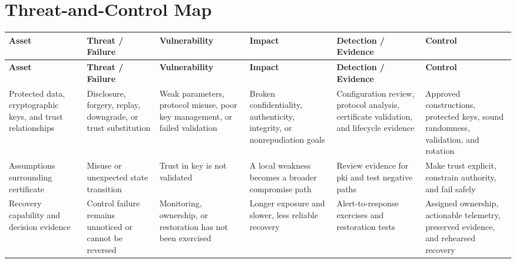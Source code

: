 \documentclass[11pt,letterpaper]{article}
\begin{document}
\section*{Threat-and-Control Map}
\begingroup\scriptsize\setlength{\tabcolsep}{2pt}
\begin{longtable}{>{\raggedright\arraybackslash}p{}>{\raggedright\arraybackslash}p{}>{\raggedright\arraybackslash}p{}>{\raggedright\arraybackslash}p{}>{\raggedright\arraybackslash}p{}>{\raggedright\arraybackslash}p{}}
\toprule\rowcolor{Navy}\color{white}\textbf{Asset} & \color{white}\textbf{Threat / Failure} & \color{white}\textbf{Vulnerability} & \color{white}\textbf{Impact} & \color{white}\textbf{Detection / Evidence} & \color{white}\textbf{Control}\\\midrule
\endfirsthead
\toprule\rowcolor{Navy}\color{white}\textbf{Asset} & \color{white}\textbf{Threat / Failure} & \color{white}\textbf{Vulnerability} & \color{white}\textbf{Impact} & \color{white}\textbf{Detection / Evidence} & \color{white}\textbf{Control}\\\midrule
\endhead
Protected data, cryptographic keys, and trust relationships & Disclosure, forgery, replay, downgrade, or trust substitution & Weak parameters, protocol misuse, poor key management, or failed validation & Broken confidentiality, authenticity, integrity, or nonrepudiation goals & Configuration review, protocol analysis, certificate validation, and lifecycle evidence & Approved constructions, protected keys, sound randomness, validation, and rotation\\\midrule
Assumptions surrounding certificate & Misuse or unexpected state transition & Trust in key is not validated & A local weakness becomes a broader compromise path & Review evidence for pki and test negative paths & Make trust explicit, constrain authority, and fail safely\\\midrule
Recovery capability and decision evidence & Control failure remains unnoticed or cannot be reversed & Monitoring, ownership, or restoration has not been exercised & Longer exposure and slower, less reliable recovery & Alert-to-response exercises and restoration tests & Assigned ownership, actionable telemetry, preserved evidence, and rehearsed recovery\\\midrule
\bottomrule
\end{longtable}
\endgroup
\end{document}
